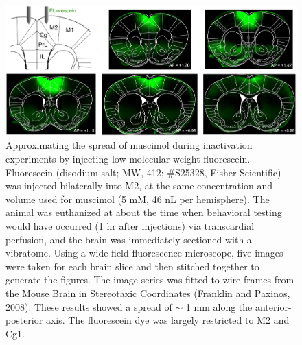 \begin{figure}[htbp]

\begin{center}
\includegraphics[width=\textwidth]{Figures/Chapter3/NN_figS4.jpg} 
\end{center}

\caption[Approximating the spread of muscimol with fluorescein]
{Approximating the spread of muscimol during inactivation experiments by injecting low-molecular-weight fluorescein.
Fluorescein (disodium salt; MW, 412; \#S25328, Fisher Scientific) was injected bilaterally into M2, at the same concentration and volume used for muscimol (5 mM, 46 nL per hemisphere). The animal was euthanized at about the time when behavioral testing would have occurred (1 hr after injections) via transcardial perfusion, and the brain was immediately sectioned with a vibratome. Using a wide-field fluorescence microscope, five images were taken for each brain slice and then stitched together to generate the figures. The image series was fitted to wire-frames from the Mouse Brain in Stereotaxic Coordinates (Franklin and Paxinos, 2008). These results showed a spread of $\sim$ 1 mm along the anterior-posterior axis. The fluorescein dye was largely restricted to M2 and Cg1.}

\label{fig:NN_figS4}
\end{figure}